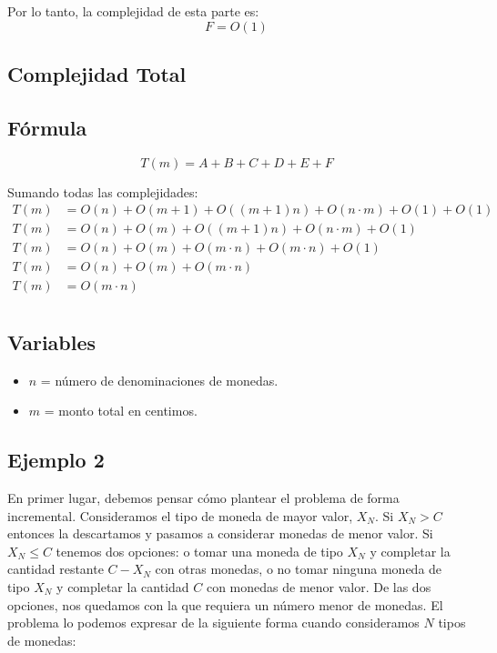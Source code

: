 Por lo tanto, la complejidad de esta parte es:
\[ F = O(1) \]

\subsection*{Complejidad Total}
\subsection*{Fórmula }

\[ T(m) = A + B + C + D + E + F \]

Sumando todas las complejidades:
\begin{align*}
T(m) &= O(n) + O(m+1) + O((m+1)n) + O(n \cdot m) + O(1) + O(1) \\
T(m) &= O(n) + O(m) + O((m+1)n) + O(n \cdot m) + O(1) \\
T(m) &= O(n) + O(m) + O(m \cdot n) + O(m \cdot n) + O(1) \\
T(m) &= O(n) + O(m) + O(m \cdot n) \\
T(m) &= O(m \cdot n) \\
\end{align*}

\subsection*{Variables}

\begin{itemize}
    \item \( n \) = número de denominaciones de monedas.
    \item \( m \) = monto total en centimos.
\end{itemize}

\subsection{Ejemplo 2}
En primer lugar, debemos pensar cómo plantear el problema de forma incremental. Consideramos el tipo de moneda de mayor valor, \(X_N\). Si \(X_N > C\) entonces la descartamos y pasamos a considerar monedas de menor valor. Si \(X_N \leq C\) tenemos dos opciones: o tomar una moneda de tipo \(X_N\) y completar la cantidad restante \(C - X_N\) con otras monedas, o no tomar ninguna moneda de tipo \(X_N\) y completar la cantidad \(C\) con monedas de menor valor. De las dos opciones, nos quedamos con la que requiera un número menor de monedas. El problema lo podemos expresar de la siguiente forma cuando consideramos \(N\) tipos de monedas:

